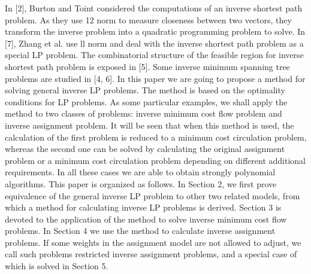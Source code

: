 \documentclass[UTF8]{article}
\begin{document}
In [2], Burton and Toint considered the computations of an inverse shortest path problem. As they use 12 norm to measure closeness between two vectors, they transform the inverse problem into a quadratic programming problem to solve. In [7], Zhang et al. use ll norm and deal with the inverse shortest path problem as a special LP problem. The combinatorial structure of the feasible region for inverse shortest path problem is exposed in [5]. Some inverse minimum spanning tree problems are studied in [4, 6]. In this paper we are going to propose a method for solving general inverse LP problems. The method is based on the optimality conditions for LP problems. As some particular examples, we shall apply the method to two classes of problems: inverse minimum cost flow problem and inverse assignment problem. It will be seen that when this method is used, the calculation of the first problem is reduced to a minimum cost circulation problem, whereas the second one can be solved by calculating the original assignment problem or a minimum cost circulation problem depending on different additional requirements. In all these cases we are able to obtain strongly polynomial algorithms. This paper is organized as follows. In Section 2, we first prove equivalence of the general inverse LP problem to other two related models, from which a method for calculating inverse LP problems is derived. Section 3 is devoted to the application of the method to solve inverse minimum cost flow problems. In Section 4 we use the method to calculate inverse assignment problems. If some weights in the assignment model are not allowed to adjust, we call such problems restricted inverse assignment problems, and a special case of which is solved in Section 5.
\end{document}
